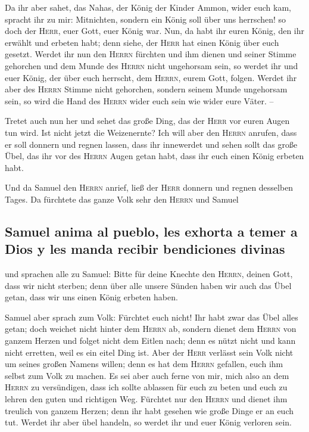  Da ihr aber sahet, das Nahas, der König der Kinder
Ammon, wider euch kam, spracht ihr zu mir: Mitnichten, sondern ein König
soll über uns herrschen! so doch der \textsc{Herr}, euer Gott, euer
König war.  Nun, da habt ihr euren König, den ihr erwählt
und erbeten habt; denn siehe, der \textsc{Herr} hat einen König über
euch gesetzt.  Werdet ihr nun den \textsc{Herrn} fürchten
und ihm dienen und seiner Stimme gehorchen und dem Munde des
\textsc{Herrn} nicht ungehorsam sein, so werdet ihr und euer König, der
über euch herrscht, dem \textsc{Herrn}, eurem Gott, folgen.
 Werdet ihr aber des \textsc{Herrn} Stimme nicht
gehorchen, sondern seinem Munde ungehorsam sein, so wird die Hand des
\textsc{Herrn} wider euch sein wie wider eure Väter. --

 Tretet auch nun her und sehet das große Ding, das der
\textsc{Herr} vor euren Augen tun wird.  Ist nicht jetzt
die Weizenernte? Ich will aber den \textsc{Herrn} anrufen, dass er soll
donnern und regnen lassen, dass ihr innewerdet und sehen sollt das große
Übel, das ihr vor des \textsc{Herrn} Augen getan habt, dass ihr euch
einen König erbeten habt.

 Und da Samuel den \textsc{Herrn} anrief, ließ der
\textsc{Herr} donnern und regnen desselben Tages. Da fürchtete das ganze
Volk sehr den \textsc{Herrn} und Samuel

\hypertarget{samuel-anima-al-pueblo-les-exhorta-a-temer-a-dios-y-les-manda-recibir-bendiciones-divinas}{%
\subsection{Samuel anima al pueblo, les exhorta a temer a Dios y les
manda recibir bendiciones
divinas}\label{samuel-anima-al-pueblo-les-exhorta-a-temer-a-dios-y-les-manda-recibir-bendiciones-divinas}}

 und sprachen alle zu Samuel: Bitte für deine Knechte den
\textsc{Herrn}, deinen Gott, dass wir nicht sterben; denn über alle
unsere Sünden haben wir auch das Übel getan, dass wir uns einen König
erbeten haben.

 Samuel aber sprach zum Volk: Fürchtet euch nicht! Ihr
habt zwar das Übel alles getan; doch weichet nicht hinter dem
\textsc{Herrn} ab, sondern dienet dem \textsc{Herrn} von ganzem Herzen
 und folget nicht dem Eitlen nach; denn es nützt nicht
und kann nicht erretten, weil es ein eitel Ding ist. 
Aber der \textsc{Herr} verlässt sein Volk nicht um seines großen Namens
willen; denn es hat dem \textsc{Herrn} gefallen, euch ihm selbst zum
Volk zu machen.  Es sei aber auch ferne von mir, mich
also an dem \textsc{Herrn} zu versündigen, dass ich sollte ablassen für
euch zu beten und euch zu lehren den guten und richtigen Weg.
 Fürchtet nur den \textsc{Herrn} und dienet ihm treulich
von ganzem Herzen; denn ihr habt gesehen wie große Dinge er an euch tut.
 Werdet ihr aber übel handeln, so werdet ihr und euer
König verloren sein.


